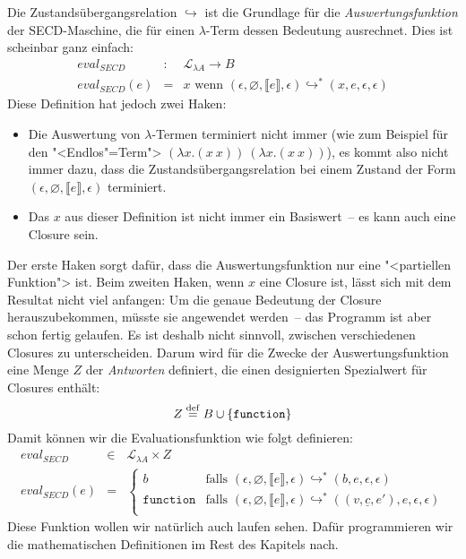 %
Die Zustandsübergangsrelation $\hookrightarrow$ ist die Grundlage
für die \textit{Auswertungsfunktion} der
SECD-Maschine, die für einen $\lambda$-Term dessen Bedeutung
ausrechnet.  Dies ist scheinbar ganz einfach:
%
\begin{eqnarray*}
  \mathit{eval}_\mathit{SECD} & : & \mathcal{L}_{\lambda{}A} \rightarrow B\\
  \mathit{eval}_\mathit{SECD}(e) &= & x \textrm{ wenn } (\epsilon, \varnothing, \llbracket e\rrbracket, \epsilon)
    \hookrightarrow^* (x, e, \epsilon, \epsilon)
\end{eqnarray*}
%
Diese Definition hat jedoch zwei Haken:
%
\begin{itemize}
\item Die Auswertung von $\lambda$-Termen terminiert nicht immer (wie
  zum Beispiel für den "<Endlos"=Term"> $(\lambda x.(x~x))~(\lambda x.(x~x))$), es kommt
  also nicht immer dazu, dass die Zustandsübergangsrelation bei einem
  Zustand der Form $(\epsilon, \varnothing, \llbracket e\rrbracket,
  \epsilon)$ terminiert.
\item Das $x$ aus dieser Definition ist nicht immer ein Basiswert~--
  es kann auch eine Closure sein.
\end{itemize}
%
Der erste Haken sorgt dafür, dass die Auswertungsfunktion nur eine
"<partiellen Funktion"> ist.  Beim zweiten
Haken, wenn $x$ eine Closure ist, lässt sich mit dem Resultat nicht
viel anfangen: Um die genaue Bedeutung der Closure herauszubekommen,
müsste sie angewendet werden~-- das Programm ist aber schon fertig
gelaufen.  Es ist deshalb nicht sinnvoll, zwischen verschiedenen
Closures zu unterscheiden.  Darum wird für die Zwecke der
Auswertungsfunktion eine Menge $Z$ der \textit{Antworten}
definiert, die einen designierten Spezialwert für Closures enthält:
%
\begin{displaymath}
  Z \stackrel{\rm def}{=}{} B \cup \{ \texttt{function} \}
\end{displaymath}
%
Damit können wir die Evaluationsfunktion wie folgt definieren:
%
\begin{eqnarray*}
  \mathit{eval}_\mathit{SECD} & \in & \mathcal{L}_{\lambda{}A} \times Z\\
  \mathit{eval}_\mathit{SECD}(e) & = &
  \begin{cases}
    b & \textrm{falls } (\epsilon, \varnothing, \llbracket e\rrbracket, \epsilon)
    \hookrightarrow^* (b, e, \epsilon, \epsilon)\\
    \texttt{function} & \textrm{falls } (\epsilon, \varnothing, \llbracket e\rrbracket, \epsilon)
    \hookrightarrow^* ((v, \underline{c}, e'), e, \epsilon, \epsilon)\\
  \end{cases}
\end{eqnarray*}
%
Diese Funktion wollen wir natürlich auch laufen sehen.  Dafür
programmieren wir die mathematischen Definitionen im Rest des Kapitels
nach.

